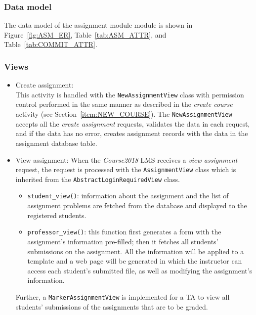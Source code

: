\subsubsection{Data model}
The data model of the assignment module module is shown in
Figure~\ref{fig:ASM_ER}, Table~\ref{tab:ASM_ATTR},
and Table~\ref{tab:COMMIT_ATTR}. \bigskip


\subsubsection{Views}
\begin{itemize}
    \item Create assignment: \\
        This activity is handled with the \texttt{NewAssignmentView} class with 
        permission control performed in the same manner as described in the
        \emph{create course} activity (see Section~\ref{item:NEW_COURSE}).
        The \texttt{NewAssignmentView} accepts all the \emph{create assignment}
        requests, validates the data in each request, and if the data has no
        error, creates assignment records with the data in the assignment
        database table.

    \item View assignment:
        When the \emph{Course2018} LMS receives a \emph{view assignment}
        request, the request is processed with the \texttt{AssignmentView}
        class which is inherited from the \texttt{AbstractLoginRequiredView}
        class.
        \begin{itemize}
            \item \texttt{student\_view()}:
                information about the assignment and the list of assignment
                problems are fetched from the database and displayed to the 
                registered students.
            \item \texttt{professor\_view()}:
            \label{item:PROF_VIEW}
                this function first generates a form with the assignment's
                information pre-filled; then it fetches all students'
                submissions on the assignment. All the information will
                be applied to a template and a web page will be generated in
                which the instructor can access each student's submitted file,
                as well as modifying the assignment's information.
        \end{itemize}

        Further, a \texttt{MarkerAssignmentView} is implemented for a TA to
        view all students' submissions of the assignments that are to be
        graded.


\end{itemize}
